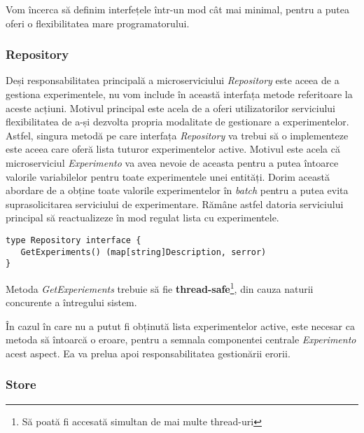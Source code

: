 \begin{remark}
	Vom încerca să definim interfețele într-un mod cât mai minimal, pentru a putea oferi o flexibilitatea mare programatorului.
\end{remark}

\subsubsection{Repository}

Deși responsabilitatea principală a microserviciului \textit{Repository} este aceea de a gestiona experimentele, nu vom include în această interfața metode referitoare la aceste acțiuni. Motivul principal este acela de a oferi utilizatorilor serviciului flexibilitatea de a-și dezvolta propria modalitate de gestionare a experimentelor. Astfel, singura metodă pe care interfața \textit{Repository} va trebui să o implementeze este aceea care oferă lista tuturor experimentelor active. Motivul este acela că microserviciul \textit{Experimento} va avea nevoie de aceasta pentru a putea întoarce valorile variabilelor pentru toate experimentele unei entități. Dorim această abordare de a obține toate valorile experimentelor în \textit{batch} pentru a putea evita suprasolicitarea serviciului de experimentare. Rămâne astfel datoria serviciului principal să reactualizeze în mod regulat lista cu experimentele.

\begin{center}
	\begin{lstlisting}[language=proto3]
type Repository interface {
   GetExperiments() (map[string]Description, serror)
}
	\end{lstlisting}
\end{center}

\begin{remark}
	Metoda \textit{GetExperiements} trebuie să fie \textbf{thread-safe}\footnote{Să poată fi accesată simultan de mai multe thread-uri}, din cauza naturii concurente a întregului sistem.
\end{remark}

În cazul în care nu a putut fi obținută lista experimentelor active, este necesar ca metoda să întoarcă o eroare, pentru a semnala componentei centrale \textit{Experimento} acest aspect. Ea va prelua apoi responsabilitatea gestionării erorii.

\subsubsection{Store}

